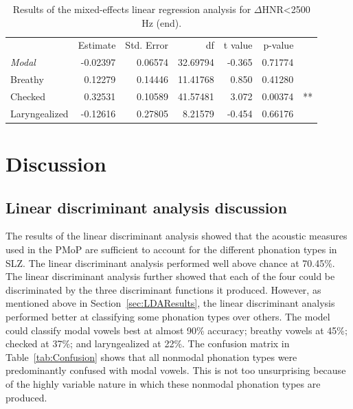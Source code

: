 \documentclass[12pt, letterpaper]{article}
\providecommand{\lsptoprule}{\midrule\toprule}
\providecommand{\lspbottomrule}{\bottomrule\midrule}
\begin{document}
\begin{table}[!h]
    \centering
    \caption{Results of the mixed-effects linear regression analysis for $ \Delta $HNR<2500 Hz (end).}
    \label{tab:delta}
    \begin{tabular}{lrrrrrl}
	\lsptoprule
					&  Estimate  & Std. Error & df & t value & p-value & \\
        \textit{Modal}  &   -0.02397 &   0.06574  & 32.69794 & -0.365 & 0.71774 & \\  
  	Breathy   		&    0.12279 &   0.14446  & 11.41768 &  0.850 & 0.41280 & \\
	Checked    		&    0.32531 &   0.10589  & 41.57481 &  3.072 & 0.00374 & ** \\
	Laryngealized	&   -0.12616 &   0.27805  &  8.21579 & -0.454 & 0.66176 & \\
    \lspbottomrule
    \end{tabular}
\end{table}

\section{Discussion} \label{sec:Discussion}

\subsection{Linear discriminant analysis discussion} \label{sec:DiscussionLDA}
The results of the linear discriminant analysis showed that the acoustic measures used in the PMoP are sufficient to account for the different phonation types in SLZ. The linear discriminant analysis performed well above chance at 70.45\%. The linear discriminant analysis further showed that each of the four could be discriminated by the three discriminant functions it produced. However, as mentioned above in Section~\ref{sec:LDAResults}, the linear discriminant analysis performed better at classifying some phonation types over others. The model could classify modal vowels best at almost 90\% accuracy; breathy vowels at 45\%; checked at 37\%; and laryngealized at 22\%. The confusion matrix in Table~\ref{tab:Confusion} shows that all nonmodal phonation types were predominantly confused with modal vowels. This is not too unsurprising because of the highly variable nature in which these nonmodal phonation types are produced. 
\end{document}
